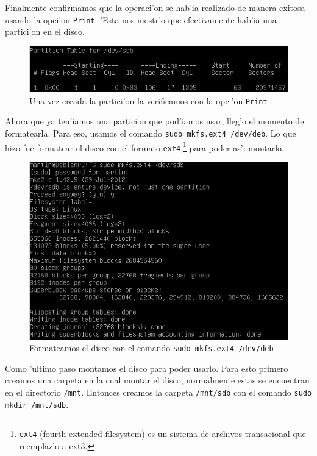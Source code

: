 \documentclass[11pt]{article}
\begin{document}
		Finalmente confirmamos que la operaci'on se hab'ia realizado de manera exitosa usando la opci'on \texttt{Print}. 'Esta nos mostr'o que efectivamente hab'ia una partici'on en el disco.

		\begin{figure}[H]
    			\centering \captionsetup{justification=centering}
    			\includegraphics[scale=0.65]{Images/rsync/rsync_disk_table.PNG}
    			\caption{Una vez creada la partici'on la verificamos con la opci'on \texttt{Print}}
    			\label{fig:rsync_disk_table}
		\end{figure}

		Ahora que ya ten'iamos una particion que pod'iamos usar, lleg'o el momento de formatearla. Para eso, usamos el comando \texttt{sudo mkfs.ext4 /dev/deb}. Lo que hizo fue formatear el disco con el formato \texttt{ext4},\footnote{\texttt{ext4} (fourth extended filesystem) es un sistema de archivos transacional que reemplaz'o a ext3.} para poder as'i montarlo.
		
 		\begin{figure}[H]
    			\centering \captionsetup{justification=centering}
    			\includegraphics[scale=0.65]{Images/rsync/rsync_disk_format.PNG}
    			\caption{Formateamos el disco con el comando \texttt{sudo mkfs.ext4 /dev/deb}}
    			\label{fig:rsync_disk_format}
		\end{figure}

		Como 'ultimo paso montamos el disco para poder usarlo. Para esto primero creamos una carpeta en la cual montar el disco, normalmente estas se encuentran en el directorio \texttt{/mnt}. Entonces creamos la carpeta \texttt{/mnt/sdb} con el comando \texttt{sudo mkdir /mnt/sdb}.
\end{document}
